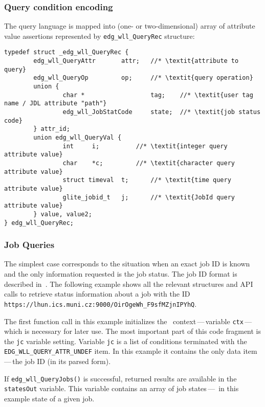\subsubsection{Query condition encoding}
The \LB query language is mapped into (one- or two-dimensional) array
of attribute value assertions represented by
\verb'edg_wll_QueryRec' structure:
\begin{lstlisting}
typedef struct _edg_wll_QueryRec {
        edg_wll_QueryAttr       attr;   //* \textit{attribute to query}
        edg_wll_QueryOp         op;     //* \textit{query operation}
        union {
                char *                  tag;    //* \textit{user tag name / JDL attribute "path"}
                edg_wll_JobStatCode     state;  //* \textit{job status code}
        } attr_id;
        union edg_wll_QueryVal {
                int     i;      	//* \textit{integer query attribute value}
                char    *c;     	//* \textit{character query attribute value}
                struct timeval  t;      //* \textit{time query attribute value}
                glite_jobid_t   j;      //* \textit{JobId query attribute value}
        } value, value2;
} edg_wll_QueryRec;
\end{lstlisting}

\subsubsection{Job Queries}

The simplest case corresponds to the situation when an exact job ID
is known and the only information requested is the job status. The job ID
format is described in~\cite{djra1.4}.
The following example shows 
all the relevant structures and API calls to retrieve status information
about a job with the ID\\
\texttt{https://lhun.ics.muni.cz:9000/OirOgeWh\_F9sfMZjnIPYhQ}.

The first function call in this example initializes the \LB\ context\,---\,variable
\texttt{ctx}\,---\,which is necessary for later use. The most important part
of this code fragment is the \texttt{jc} variable setting.
Variable \texttt{jc} is a list of conditions terminated with the 
\texttt{EDG\_WLL\_QUERY\_ATTR\_UNDEF} item.
In this example it contains the only data item\,---\,the job ID
(in its parsed form).

If \texttt{edg\_wll\_QueryJobs()} is successful, returned results are available 
in the \texttt{statesOut} variable. This variable contains an array of job states\,---\,
in this example state of a given job.

